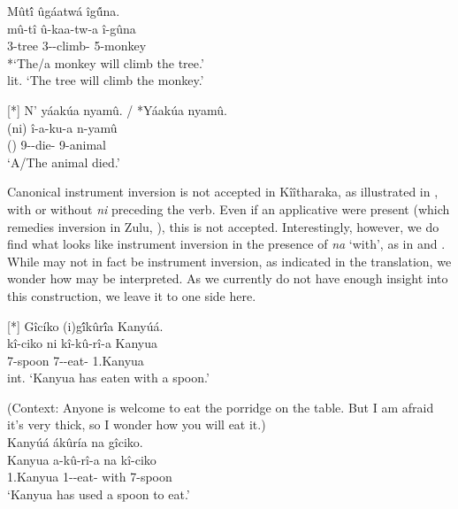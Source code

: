 \documentclass[output=paper]{langscibook}
\begin{document}
\ex
Mût\'{î} ûgáatwá îg\'{û}na.\\
\gll
mû-tî  û-kaa-tw-a  î-gûna\\
3-tree 3\SM{}-\FUT{}-climb-\FV{} 5-monkey\\
\glt
*`The/a monkey will climb the tree.’\\
lit. ‘The tree will climb the monkey.’

\z

\ex
[*]{
\label{bkm:Ref115793377}
N’ yáakúa nyamû. / *Yáakúa nyamû.\\
\gll
(ni)  î-a-ku-a  n-yamû \\
(\FOC)  9\SM-\PST{}-die-\FV{} 9-animal\\
\glt
‘A/The animal died.’
}
\z

Canonical instrument inversion is not accepted in Kîîtharaka, as illustrated in , with or without \textit{ni} preceding the verb. Even if an applicative were present (which remedies inversion in Zulu, \citealt{Zeller2013}), this is not accepted. Interestingly, however, we do find what looks like instrument inversion in the presence of \textit{na} ‘with’, as in  and . While  may not in fact be instrument inversion, as indicated in the translation, we wonder how  may be interpreted. As we currently do not have enough insight into this construction, we leave it to one side here.

\ea
[*]{
\label{bkm:Ref117501764}
Gîcíko (i)g\'{î}kûr\'{î}a Kanyúá.\\
\gll
kî-ciko  ni  kî-kû-rî-a  Kanyua\\
7-spoon \FOC{} 7\SM-\PRS{}-eat-\FV{} 1.Kanyua\\
\glt
int. ‘Kanyua has eaten with a spoon.’
}

\z

\ea
\label{bkm:Ref117502171}
\ea
\label{bkm:Ref117502171:a}
(Context: Anyone is welcome to eat the porridge on the table. But I am afraid it’s very thick, so I wonder how you will eat it.)\\
Kanyúá ákûría na gîciko.\\
\gll
Kanyua   a-kû-rî-a   na   kî-ciko\\
1.Kanyua 1\SM-\PRS{}-eat-\FV{} with   7-spoon\\
\glt
‘Kanyua has used a spoon to eat.’
\end{document}

